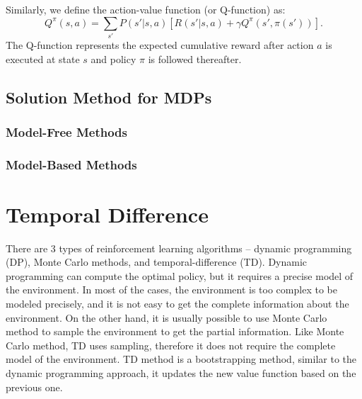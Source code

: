 Similarly, we define the action-value function (or Q-function) as:
\begin{equation}
    Q^{\pi}(s, a) = \sum_{s'}P(s'|s, a)[R(s'|s, a) + \gamma Q^{\pi}(s', \pi(s'))].
    \label{eq:Q}
\end{equation}
The Q-function represents the expected cumulative reward after action $a$ is executed at state $s$ and 
policy $\pi$ is followed thereafter.






\subsection{Solution Method for MDPs}
\subsubsection{Model-Free Methods}
\subsubsection{Model-Based Methods}
\section{Temporal Difference}
\label{sec:TD}
There are 3 types of reinforcement learning algorithms -- dynamic programming (DP), Monte Carlo 
methods, and temporal-difference (TD). Dynamic programming can compute the optimal policy, but it 
requires a precise model of the environment. In most of the cases, the environment
is too complex to be modeled precisely, and it is not easy to get the complete information about
the environment. On the other hand, it is usually possible to use Monte Carlo method to sample the environment to
get the partial information. 
Like Monte Carlo method, TD uses sampling, therefore it does not require the 
complete model of the environment. TD method is a bootstrapping method, similar to the dynamic 
programming approach, it updates the new value function based on the previous one.

